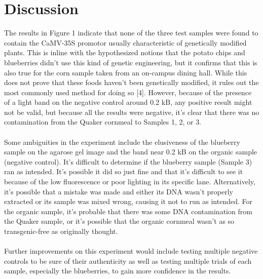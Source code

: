 \documentclass{article}
\begin{document}


\pagebreak

\section{Discussion}

The results in Figure 1 indicate that none of the three test samples were found to contain the CaMV-35S promotor usually characteristic of genetically modified plants. This is inline with the hypothesized notions that the potato chips and blueberries didn't use this kind of genetic engineering, but it confirms that this is also true for the corn sample taken from an on-campus dining hall. While this does not prove that these foods haven't been genetically modified, it rules out the most commonly used method for doing so [4]. However, because of the presence of a light band on the negative control around 0.2 kB, any positive result might not be valid, but because all the results were negative, it's clear that there was no contamination from the Quaker cornmeal to Samples 1, 2, or 3.\\
\\
Some ambiguities in the experiment include the elusiveness of the blueberry sample on the agarose gel image and the band near 0.2 kB on the organic sample (negative control). It's difficult to determine if the blueberry sample (Sample 3) ran as intended. It's possible it did so just fine and that it's difficult to see it because of the low fluorescence or poor lighting in its specific lane. Alternatively, it's possible that a mistake was made and either its DNA wasn't properly extracted or its sample was mixed wrong, causing it not to run as intended. For the organic sample, it's probable that there was some DNA contamination from the Quaker sample, or it's possible that the organic cornmeal wasn't as so transgenic-free as originally thought.\\
\\
Further improvements on this experiment would include testing multiple negative controls to be sure of their authenticity as well as testing multiple trials of each sample, especially the blueberries, to gain more confidence in the results. 
\end{document}
